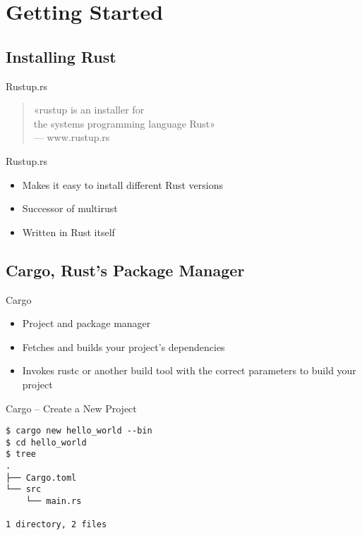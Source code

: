 \section{Getting Started}

\subsection{Installing Rust}

\begin{frame}[c]{Rustup.rs}
\begin{quote}
«rustup is an installer for \\
the systems programming language Rust» \\
\vspace{0.5em}
{\normalfont \small --- www.rustup.rs}
\end{quote}
\end{frame}

\begin{frame}[c]{Rustup.rs}
\begin{itemize}
    \item Makes it easy to install different Rust versions
    \item Successor of multirust
    \item Written in Rust itself
\end{itemize}
\end{frame}

\subsection{Cargo, Rust's Package Manager}
\begin{frame}[c]{Cargo}
    \begin{itemize}
        \item Project and package manager
        \item Fetches and builds your project’s dependencies
        \item Invokes rustc or another build tool with the correct parameters
            to build your project
    \end{itemize}
\end{frame}
\begin{frame}[fragile]{Cargo -- Create a New Project}
\begin{verbatim}
$ cargo new hello_world --bin
$ cd hello_world
$ tree
.
├── Cargo.toml
└── src
    └── main.rs

1 directory, 2 files
\end{verbatim}
\end{frame}

